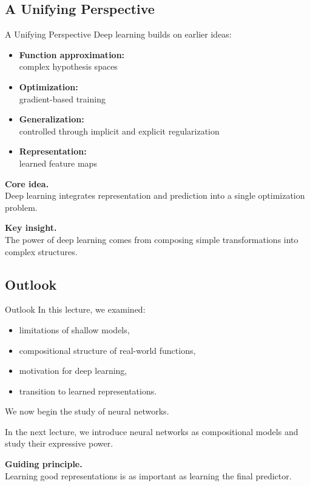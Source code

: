 \documentclass[aspectratio=169,11pt]{beamer}
\begin{document}
\subsection{A Unifying Perspective}
\begin{frame}[t,allowframebreaks]{A Unifying Perspective}
\small
Deep learning builds on earlier ideas:

\begin{itemize}
    \item \textbf{Function approximation:}\\ complex hypothesis spaces
    \item \textbf{Optimization:}\\ gradient-based training
    \item \textbf{Generalization:}\\ controlled through implicit and explicit regularization
    \item \textbf{Representation:}\\ learned feature maps
\end{itemize}

\textbf{Core idea.}\\ Deep learning integrates representation and prediction into a single optimization problem.

\textbf{Key insight.}\\ The power of deep learning comes from composing simple transformations into complex structures.
\end{frame}

\subsection{Outlook}
\begin{frame}[t,allowframebreaks]{Outlook}
\small
In this lecture, we examined:

\begin{itemize}
    \item limitations of shallow models,
    \item compositional structure of real-world functions,
    \item motivation for deep learning,
    \item transition to learned representations.
\end{itemize}

We now begin the study of neural networks.

In the next lecture, we introduce neural networks as compositional models and study their expressive power.

\textbf{Guiding principle.}\\ Learning good representations is as important as learning the final predictor.
\end{frame}
\end{document}

